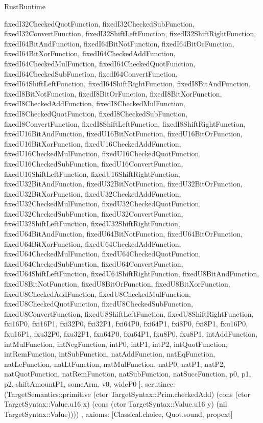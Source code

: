\begin{lexlean}{RustRuntime}
\begin{semanticmodule}
{{      fixedI32CheckedQuotFunction,
      fixedI32CheckedSubFunction,
      fixedI32ConvertFunction,
      fixedI32ShiftLeftFunction,
      fixedI32ShiftRightFunction,
      fixedI64BitAndFunction,
      fixedI64BitNotFunction,
      fixedI64BitOrFunction,
      fixedI64BitXorFunction,
      fixedI64CheckedAddFunction,
      fixedI64CheckedMulFunction,
      fixedI64CheckedQuotFunction,
      fixedI64CheckedSubFunction,
      fixedI64ConvertFunction,
      fixedI64ShiftLeftFunction,
      fixedI64ShiftRightFunction,
      fixedI8BitAndFunction,
      fixedI8BitNotFunction,
      fixedI8BitOrFunction,
      fixedI8BitXorFunction,
      fixedI8CheckedAddFunction,
      fixedI8CheckedMulFunction,
      fixedI8CheckedQuotFunction,
      fixedI8CheckedSubFunction,
      fixedI8ConvertFunction,
      fixedI8ShiftLeftFunction,
      fixedI8ShiftRightFunction,
      fixedU16BitAndFunction,
      fixedU16BitNotFunction,
      fixedU16BitOrFunction,
      fixedU16BitXorFunction,
      fixedU16CheckedAddFunction,
      fixedU16CheckedMulFunction,
      fixedU16CheckedQuotFunction,
      fixedU16CheckedSubFunction,
      fixedU16ConvertFunction,
      fixedU16ShiftLeftFunction,
      fixedU16ShiftRightFunction,
      fixedU32BitAndFunction,
      fixedU32BitNotFunction,
      fixedU32BitOrFunction,
      fixedU32BitXorFunction,
      fixedU32CheckedAddFunction,
      fixedU32CheckedMulFunction,
      fixedU32CheckedQuotFunction,
      fixedU32CheckedSubFunction,
      fixedU32ConvertFunction,
      fixedU32ShiftLeftFunction,
      fixedU32ShiftRightFunction,
      fixedU64BitAndFunction,
      fixedU64BitNotFunction,
      fixedU64BitOrFunction,
      fixedU64BitXorFunction,
      fixedU64CheckedAddFunction,
      fixedU64CheckedMulFunction,
      fixedU64CheckedQuotFunction,
      fixedU64CheckedSubFunction,
      fixedU64ConvertFunction,
      fixedU64ShiftLeftFunction,
      fixedU64ShiftRightFunction,
      fixedU8BitAndFunction,
      fixedU8BitNotFunction,
      fixedU8BitOrFunction,
      fixedU8BitXorFunction,
      fixedU8CheckedAddFunction,
      fixedU8CheckedMulFunction,
      fixedU8CheckedQuotFunction,
      fixedU8CheckedSubFunction,
      fixedU8ConvertFunction,
      fixedU8ShiftLeftFunction,
      fixedU8ShiftRightFunction,
      fxi16P0,
      fxi16P1,
      fxi32P0,
      fxi32P1,
      fxi64P0,
      fxi64P1,
      fxi8P0,
      fxi8P1,
      fxu16P0,
      fxu16P1,
      fxu32P0,
      fxu32P1,
      fxu64P0,
      fxu64P1,
      fxu8P0,
      fxu8P1,
      intAddFunction,
      intMulFunction,
      intNegFunction,
      intP0,
      intP1,
      intP2,
      intQuotFunction,
      intRemFunction,
      intSubFunction,
      natAddFunction,
      natEqFunction,
      natLeFunction,
      natLtFunction,
      natMulFunction,
      natP0,
      natP1,
      natP2,
      natQuotFunction,
      natRemFunction,
      natSubFunction,
      natSuccFunction,
      p0,
      p1,
      p2,
      shiftAmountP1,
      someArm,
      v0,
      wideP0
    ],
    scrutinee: (TargetSemantics::primitive (ctor TargetSyntax::Prim.checkedAdd) (cons (ctor TargetSyntax::Value.u16 x) (cons (ctor TargetSyntax::Value.u16 y) (nil TargetSyntax::Value))))
  },
  axioms: [Classical.choice, Quot.sound, propext]
}


\end{semanticmodule}
\end{lexlean}
